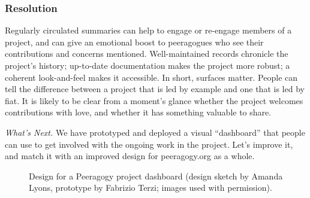 \subsubsection*{Resolution} 
Regularly circulated summaries can help to engage or re-engage members of a project, and can give an emotional boost to peeragogues who see their contributions and concerns mentioned.  Well-maintained records chronicle the project's history; up-to-date documentation makes the project more robust; a coherent look-and-feel makes it accessible.
%
In short, surfaces matter.  People can tell the difference between a project that is led by example and one that is led by fiat.  It is likely to be clear from a moment's glance whether the project welcomes contributions with love, and whether it has something valuable to share.

\begin{framed}
\emph{What's Next.}
We have prototyped and deployed a visual ``dashboard'' that people can use to get involved with the ongoing work in the project.  Let's improve it, and match it with an improved design for peeragogy.org as a whole.
\end{framed}    


\begin{figure}
\caption{Design for a Peeragogy project dashboard (design sketch by Amanda Lyons, prototype by Fabrizio Terzi; images used with permission).\label{dashboard}}
\end{figure}

